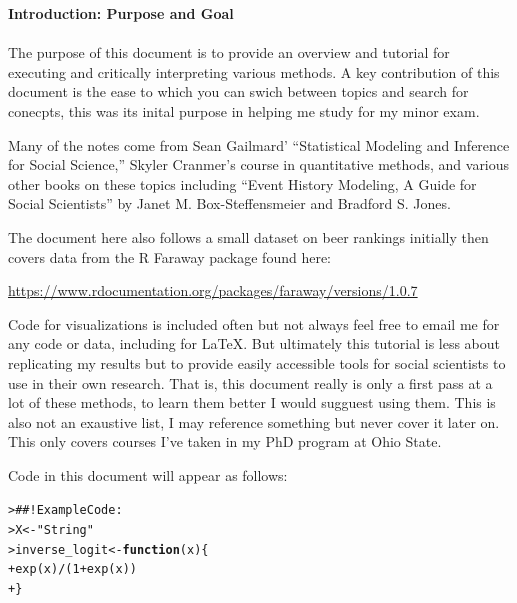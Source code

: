 \documentclass[12pt]{article}\usepackage[]{graphicx}\usepackage[]{color}
\date{\today} %
\makeatletter
\newcommand{\hlnum}[1]{\textcolor[rgb]{0.82,0.78,0.62}{#1}}%
\newcommand{\hlstr}[1]{\textcolor[rgb]{0.82,0.78,0.62}{#1}}%
\newcommand{\hlcom}[1]{\textcolor[rgb]{0.404,0.408,0.42}{#1}}%
\newcommand{\hlopt}[1]{\textcolor[rgb]{0.882,0.878,0.898}{#1}}%
\newcommand{\hlstd}[1]{\textcolor[rgb]{0.882,0.878,0.898}{#1}}%
\newcommand{\hlkwa}[1]{\textcolor[rgb]{0.384,0.675,0.808}{\textbf{#1}}}%
\newcommand{\hlkwb}[1]{\textcolor[rgb]{0.902,0.675,0.196}{#1}}%
\newcommand{\hlkwc}[1]{\textcolor[rgb]{0.812,0.522,0.388}{#1}}%
\newcommand{\hlkwd}[1]{\textcolor[rgb]{0.733,0.388,0.812}{#1}}%
\newenvironment{kframe}{%
 \def\at@end@of@kframe{}%
 \ifinner\ifhmode%
  \def\at@end@of@kframe{\end{minipage}}%
  \begin{minipage}{\columnwidth}%
 \fi\fi%
 \def\FrameCommand##1{\hskip\@totalleftmargin \hskip-\fboxsep
 \colorbox{shadecolor}{##1}\hskip-\fboxsep
     \hskip-\linewidth \hskip-\@totalleftmargin \hskip\columnwidth}%
 \MakeFramed {\advance\hsize-\width
   \@totalleftmargin\z@ \linewidth\hsize
   \@setminipage}}%
 {\par\unskip\endMakeFramed%
 \at@end@of@kframe}
\newenvironment{knitrout}{}{} %
\makeatother
\begin{document}
\begin{flushleft}
\setlength{\parindent}{1cm} %



\thispagestyle{empty}
\noindent \textbf{Introduction: Purpose and Goal}\\
\hfill \\
The purpose of this document is to provide an overview and tutorial for executing and critically interpreting various methods. A key contribution of this document is the ease to which you can swich between topics and search for conecpts, this was its inital purpose in helping me study for my minor exam.

Many of the notes come from Sean Gailmard' ``Statistical Modeling and Inference for Social Science,'' Skyler Cranmer's course in quantitative methods, and various other books on these topics including ``Event History Modeling, A Guide for Social Scientists'' by Janet M. Box-Steffensmeier and Bradford S. Jones.

The document here also follows a small dataset on beer rankings initially then covers data from the R Faraway package found here:

\begin{center}
\url{https://www.rdocumentation.org/packages/faraway/versions/1.0.7}
\end{center}

Code for visualizations is included often but not always feel free to email me for any code or data, including for \LaTeX. But ultimately this tutorial is less about replicating my results but to provide easily accessible tools for social scientists to use in their own research. That is, this document really is only a first pass at a lot of these methods, to learn them better I would sugguest using them. This is also not an exaustive list, I may reference something but never cover it later on. This only covers courses I've taken in my PhD program at Ohio State.

Code in this document will appear as follows:




\begin{knitrout}
\color{fgcolor}\begin{kframe}
\begin{alltt}
\hlstd{> }\hlcom{##!  Example Code:}
\hlstd{> }\hlstd{X} \hlkwb{<-} \hlstr{"String"}
\hlstd{> }\hlstd{inverse_logit} \hlkwb{<-} \hlkwa{function}\hlstd{(}\hlkwc{x}\hlstd{)\{}
\hlstd{+ }     \hlkwd{exp}\hlstd{(x)}\hlopt{/}\hlstd{(}\hlnum{1}\hlopt{+}\hlkwd{exp}\hlstd{(x))}
\hlstd{+ }\hlstd{\}}
\end{alltt}
\end{kframe}
\end{knitrout}



\end{flushleft}
\end{document}
